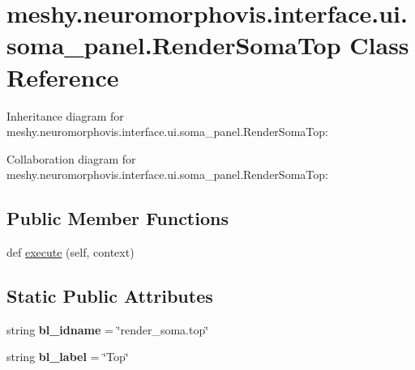 \hypertarget{classmeshy_1_1neuromorphovis_1_1interface_1_1ui_1_1soma__panel_1_1RenderSomaTop}{}\section{meshy.\+neuromorphovis.\+interface.\+ui.\+soma\+\_\+panel.\+Render\+Soma\+Top Class Reference}
\label{classmeshy_1_1neuromorphovis_1_1interface_1_1ui_1_1soma__panel_1_1RenderSomaTop}


Inheritance diagram for meshy.\+neuromorphovis.\+interface.\+ui.\+soma\+\_\+panel.\+Render\+Soma\+Top\+:


Collaboration diagram for meshy.\+neuromorphovis.\+interface.\+ui.\+soma\+\_\+panel.\+Render\+Soma\+Top\+:
\subsection*{Public Member Functions}
\begin{DoxyCompactItemize}
\item 
def \hyperlink{classmeshy_1_1neuromorphovis_1_1interface_1_1ui_1_1soma__panel_1_1RenderSomaTop_a1ab14f33721f91d0eda09913589ef879}{execute} (self, context)
\end{DoxyCompactItemize}
\subsection*{Static Public Attributes}
\begin{DoxyCompactItemize}
\item 
string {\bfseries bl\+\_\+idname} = \char`\"{}render\+\_\+soma.\+top\char`\"{}\hypertarget{classmeshy_1_1neuromorphovis_1_1interface_1_1ui_1_1soma__panel_1_1RenderSomaTop_a70334ffb79a8402e3426626c1817c149}{}\label{classmeshy_1_1neuromorphovis_1_1interface_1_1ui_1_1soma__panel_1_1RenderSomaTop_a70334ffb79a8402e3426626c1817c149}

\item 
string {\bfseries bl\+\_\+label} = \char`\"{}Top\char`\"{}\hypertarget{classmeshy_1_1neuromorphovis_1_1interface_1_1ui_1_1soma__panel_1_1RenderSomaTop_aa1ec086380079ad827e76cdbf41fb691}{}\label{classmeshy_1_1neuromorphovis_1_1interface_1_1ui_1_1soma__panel_1_1RenderSomaTop_aa1ec086380079ad827e76cdbf41fb691}

\end{DoxyCompactItemize}


